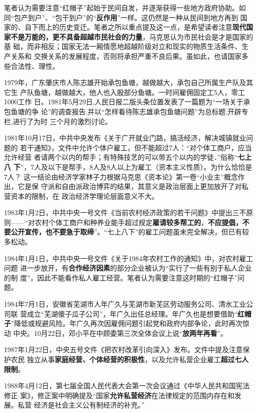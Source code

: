 笔者认为需要注意“红帽子”起始于民间自发，并逐渐获得一些地方政府协助。如
同“包产到户”、“包干到户”的“\textbf{反作用}”一样。这仍然是一种从民间到地方再到
国家的、自下而上的历史变迁。笔者之所以重点提及这一点，是希望读者注意\textbf{现代国
  家不是万能的，更不具备超越市民社会的力量}，马克思认为市民社会是才是国家的基
础，而非相反；国家无法一厢情愿地超越阶级对立和现实的物质生活条件、生产关系和
交换关系的发展程度，否则将承担严重不良后果。虽如此，也请国家多些合法性、理性。


1979年，广东肇庆市人陈志雄开始承包鱼塘，越做越大，承包自己所属生产队及其它生
产队鱼塘，越做越大，他人也入股部分鱼塘。一时间雇佣固定工5人，零工1000工作
日。1981年5月29日,人民日报二版头条位置发表了一篇题为“一场关于承包鱼塘的争
论”的调查报告,并以“怎样看待陈志雄承包鱼塘问题”为总标题,开辟专栏,进行了为时
三个月的激烈讨论。

1981年10月17日，中共中央发布《关于广开就业门路，搞活经济，解决城镇就业问题的
若干通知》，文件中允许个体户雇工，但不能超过7人：“对个体工商户，应当允许经营
者请两个以内的帮手；有特殊技艺的可以带五个以内的学徒．”俗称“\textbf{七上八
  下}”，7人及以下是帮手，8人及8人以上为雇工（资本主义性质）。为什么恰恰是7人？
这一结论由经济学家林子力根据马克思《资本论》第一卷“小业主”概念作出，它是保
守派和自由派政治博弈的结果，其意义是政治层面上更加放开了对私营资本的限制，在
政治经济学理论层面意义不大。

1983年1月2日，中共中央一号文件《当前农村经济政策的若干问题》中提出三不原
则——“对农村个体工商户和种养业能手超过规定\textbf{雇请较多帮工的}，\textbf{不应提倡，不
  要公开宣传，也不要急于取缔}”。“七上八下”的雇工问题虽未完全解决，但已有较
多松动。

1984年1月1日，中共中央一号文件《关于1984年农村工作的通知》中，对农村雇工问题
进一步放开，有\textbf{合作经济因素}的部分企业被认为“实行了一些有别于私人企业的制
度”，因此不能看作私人雇工经营。笔者认为需要注意这时期的“红帽子”问题。

1984年7月1日，安徽省芜湖市人年广久与芜湖市新芜区劳动服务公司、清水工业公司联
营成立“芜湖傻子瓜子公司”，年广久出任总经理。年广久也是想要借助“\textbf{红帽
  子}”降低或规避风险。年广久再次因雇佣问题引起党和政府内部争论，此时再次惊动
中央。10月22日，邓小平在中顾委第三次全体会议上说“\textbf{放两年再看}”。

1987年1月22日，中央五号文件《把农村改革引向深入》发布。文件中提及注意保护农民
独立从事\textbf{家庭经营、个体经营的积极性}，以及允许私营企业雇工\textbf{超过七人限制}。

1988年4月12日，第七届全国人民代表大会第一次会议通过《中华人民共和国宪法修正
案》，修正案中明确提及“国家\textbf{允许私营经济}在法律规定的范围内存在和发展。私营
经济是社会主义公有制经济的补充。”

